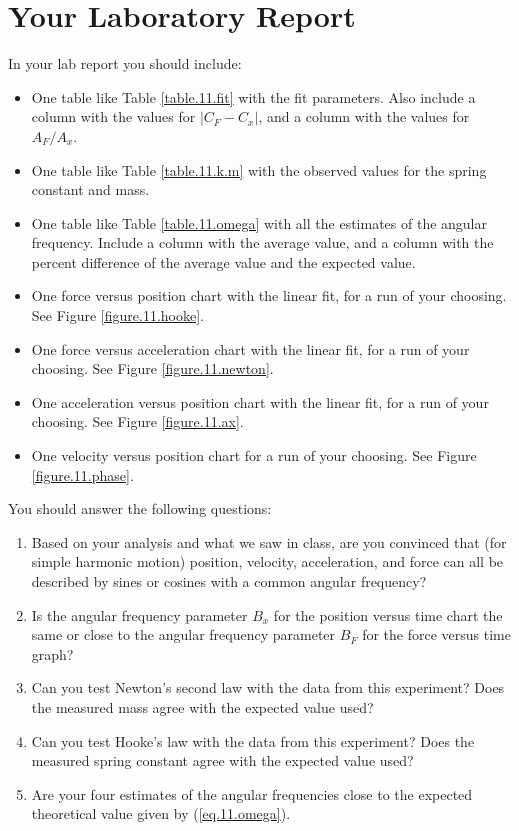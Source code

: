 \section{Your Laboratory Report}
%
In your lab report you should include:
\begin{itemize}
    \item One table like Table \ref{table.11.fit} with the fit parameters. Also include a column with the values for $\vert C_{F} - C_{x} \vert$, and a column with the values for $A_{F} / A_{x}$.
    \item One table like Table \ref{table.11.k.m} with the observed values for the spring constant and mass.
    \item One table like Table \ref{table.11.omega} with all the estimates of the angular frequency. Include a column with the average value, and a column with the percent difference of the average value and the expected value.
    \item One force versus position chart with the linear fit, for a run of your choosing. See Figure \ref{figure.11.hooke}.
    \item One force versus acceleration chart with the linear fit, for a run of your choosing. See Figure \ref{figure.11.newton}.
    \item One acceleration versus position chart with the linear fit, for a run of your choosing. See Figure \ref{figure.11.ax}.
    \item One velocity versus position chart for a run of your choosing. See Figure \ref{figure.11.phase}.
\end{itemize}
You should answer the following questions:
\begin{enumerate}
    \item Based on your analysis and what we saw in class, are you convinced that (for simple harmonic motion) position, velocity, acceleration, and force can all be described by sines or cosines with a common angular frequency?
    \item Is the angular frequency parameter $B_{x}$ for the position versus time chart the same or close to the angular frequency parameter $B_{F}$ for the force versus time graph?
    \item Can you test Newton's second law with the data from this experiment? Does the measured mass agree with the expected value used?
    \item Can you test Hooke's law with the data from this experiment? Does the measured spring constant agree with the expected value used?
    \item Are your four estimates of the angular frequencies close to the expected theoretical value given by (\ref{eq.11.omega}).
\end{enumerate}
%
\newpage
